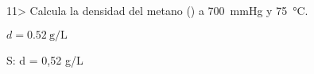 \documentclass{article}
\begin{document}
\begin{exercise}
  11> Calcula la densidad del metano () a \SI{700}{\mmHg} y \SI{75}{\celsius}.
\end{exercise}
\begin{solution}
  $d = \SI{0,52}{\gram\per\liter}$
\end{solution}
S: d = 0,52 g/L
%
%
%
%
%
%
%
%
%
%
%
%
%
%
\end{document}
